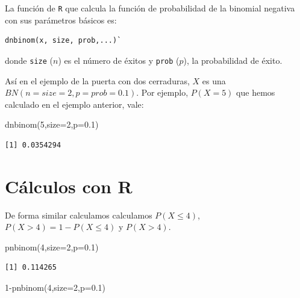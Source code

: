 \documentclass[
  letterpaper,
  DIV=11,
  numbers=noendperiod]{scrreprt}
\newenvironment{Shaded}{\begin{snugshade}}{\end{snugshade}}
\newcommand{\AttributeTok}[1]{\textcolor[rgb]{0.40,0.45,0.13}{#1}}
\newcommand{\DecValTok}[1]{\textcolor[rgb]{0.68,0.00,0.00}{#1}}
\newcommand{\FloatTok}[1]{\textcolor[rgb]{0.68,0.00,0.00}{#1}}
\newcommand{\FunctionTok}[1]{\textcolor[rgb]{0.28,0.35,0.67}{#1}}
\newcommand{\NormalTok}[1]{\textcolor[rgb]{0.00,0.23,0.31}{#1}}
\newcommand{\SpecialCharTok}[1]{\textcolor[rgb]{0.37,0.37,0.37}{#1}}
\begin{document}
La función de \texttt{R} que calcula la función de probabilidad de la
binomial negativa con sus parámetros básicos es:

\begin{verbatim}
dnbinom(x, size, prob,...)`
\end{verbatim}

donde \texttt{size} (\(n\)) es el número de éxitos y \texttt{prob}
(\(p\)), la probabilidad de éxito.

Así en el ejemplo de la puerta con dos cerraduras, \(X\) es una
\(BN(n=size=2,p=prob=0.1)\). Por ejemplo, \(P(X=5)\) que hemos calculado
en el ejemplo anterior, vale:

\begin{Shaded}
\begin{Highlighting}[]
\FunctionTok{dnbinom}\NormalTok{(}\DecValTok{5}\NormalTok{,}\AttributeTok{size=}\DecValTok{2}\NormalTok{,}\AttributeTok{p=}\FloatTok{0.1}\NormalTok{)}
\end{Highlighting}
\end{Shaded}

\begin{verbatim}
[1] 0.0354294
\end{verbatim}

\section{Cálculos con R}\label{cuxe1lculos-con-r-3}

De forma similar calculamos calculamos \(P(X\leq 4)\),
\(P(X>4)=1-P(X\leq 4)\) y \(P(X>4)\).

\begin{Shaded}
\begin{Highlighting}[]
\FunctionTok{pnbinom}\NormalTok{(}\DecValTok{4}\NormalTok{,}\AttributeTok{size=}\DecValTok{2}\NormalTok{,}\AttributeTok{p=}\FloatTok{0.1}\NormalTok{)}
\end{Highlighting}
\end{Shaded}

\begin{verbatim}
[1] 0.114265
\end{verbatim}

\begin{Shaded}
\begin{Highlighting}[]
\DecValTok{1}\SpecialCharTok{{-}}\FunctionTok{pnbinom}\NormalTok{(}\DecValTok{4}\NormalTok{,}\AttributeTok{size=}\DecValTok{2}\NormalTok{,}\AttributeTok{p=}\FloatTok{0.1}\NormalTok{)}
\end{Highlighting}
\end{Shaded}
\end{document}
